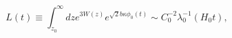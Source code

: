 \begin{equation}
L(t) \equiv \int^{\infty}_{z_0} dz e^{3W(z)} e^{\sqrt{2} b \kappa \phi_0(t)}
\sim C_0^{-2} \lambda_0^{-1} (H_0 t),
\end{equation}

